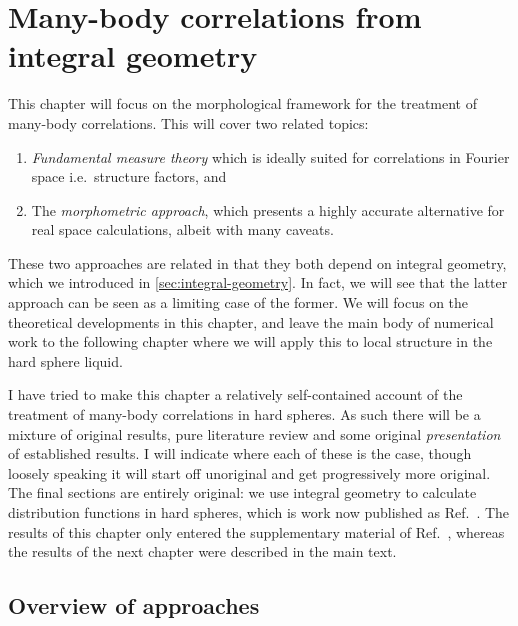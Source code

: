 \documentclass[12pt]{report}
\begin{document}
\chapter{Many-body correlations from integral geometry}

This chapter will focus on the morphological framework for the treatment of many-body correlations.
This will cover two related topics:
\begin{enumerate}
\item \emph{Fundamental measure theory} which is ideally suited for correlations in Fourier space i.e.\ structure factors, and
\item The \emph{morphometric approach}, which presents a highly accurate alternative for real space calculations, albeit with many caveats.
\end{enumerate}
These two approaches are related in that they both depend on integral geometry, which we introduced in \ref{sec:integral-geometry}.
In fact, we will see that the latter approach can be seen as a limiting case of the former.
We will focus on the theoretical developments in this chapter, and leave the main body of numerical work to the following chapter where we will apply this to local structure in the hard sphere liquid.

I have tried to make this chapter a relatively self-contained account of the treatment of many-body correlations in hard spheres.
As such there will be a mixture of original results, pure literature review and some original \emph{presentation} of established results.
I will indicate where each of these is the case, though loosely speaking it will start off unoriginal and get progressively more original.
The final sections are entirely original: we use integral geometry to calculate distribution functions in hard spheres, which is work now published as Ref.\ \cite{Robinson2019}.
The results of this chapter only entered the supplementary material of Ref.\ \cite{Robinson2019}, whereas the results of the next chapter were described in the main text.

\section{Overview of approaches}
\end{document}
